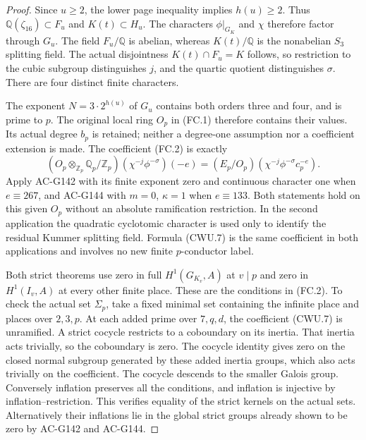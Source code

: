 \begin{proof}
Since $u\geq2$, the lower page inequality implies $h(u)\geq2$.
Thus $\mathbb Q(\zeta_{16})\subset F_u$ and $K(t)\subset H_u$.
The characters $\phi|_{G_K}$ and $\chi$ therefore factor through
$G_u$.  The field $F_u/\mathbb Q$ is abelian, whereas $K(t)/\mathbb Q$
is the nonabelian $S_3$ splitting field.  The actual disjointness
$K(t)\cap F_u=K$ follows, so restriction to the cubic subgroup
distinguishes $j$, and the quartic quotient distinguishes $\sigma$.
There are four distinct finite characters.

The exponent $N=3\cdot2^{h(u)}$ of $G_u$ contains both orders three
and four, and is prime to $p$.  The original local ring $O_p$ in
(FC.1) therefore contains their values.  Its actual degree $b_p$
is retained; neither a degree-one assumption nor a coefficient
extension is made.  The coefficient (FC.2) is exactly
\[
 (O_p\otimes_{\mathbb Z_p}\mathbb Q_p/\mathbb Z_p)
       (\chi^{-j}\phi^{-\sigma})(-e)
       =(E_p/O_p)(\chi^{-j}\phi^{-\sigma}c_p^{-e}).
 \tag{CWU.7}
\]
Apply AC-G142 with its finite exponent zero and continuous character
one when $e\equiv267$, and AC-G144 with $m=0$, $\kappa=1$ when
$e\equiv133$.  Both statements hold on this given $O_p$ without an
absolute ramification restriction.  In the second application the
quadratic cyclotomic character is used only to identify the residual
Kummer splitting field.  Formula (CWU.7) is the same coefficient in
both applications and involves no new finite $p$-conductor label.

Both strict theorems use zero in full $H^1(G_{K_v},A)$ at $v\mid p$
and zero in $H^1(I_v,A)$ at every other finite place.
These are the conditions in (FC.2).  To check the actual set
$\Sigma_p$, take a fixed minimal set containing the infinite place
and places over $2,3,p$.  At each added prime over $7,q,d$, the
coefficient (CWU.7) is unramified.  A strict cocycle restricts to a
coboundary on its inertia.  That inertia acts trivially, so the
coboundary is zero.  The cocycle identity gives zero on the closed
normal subgroup generated by these added inertia groups, which also
acts trivially on the coefficient.  The cocycle descends to the
smaller Galois group.  Conversely inflation preserves all the
conditions, and inflation is injective by inflation--restriction.
This verifies equality of the strict kernels on the actual sets.
Alternatively their inflations lie in the global strict groups
already shown to be zero by AC-G142 and AC-G144.


\end{proof}
